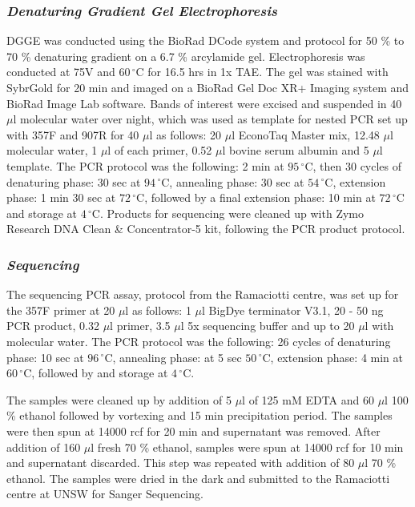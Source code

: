 \documentclass[11pt]{article}
\begin{document}
\subsubsection{\emph{Denaturing Gradient Gel Electrophoresis}}
DGGE was conducted using the BioRad DCode system and protocol for 50 \% to 70 \% denaturing gradient on a 6.7 \% arcylamide gel. Electrophoresis was conducted at 75V and $60\,^{\circ}\mathrm{C}$ for 16.5 hrs in 1x TAE. The gel was stained with SybrGold for 20 min and imaged on a BioRad Gel Doc XR+ Imaging system and BioRad Image Lab software. Bands of interest were excised and suspended in 40 $\mu$l molecular water over night, which was used as template for nested PCR set up with 357F and 907R for 40 $\mu$l as follows: 20 $\mu$l EconoTaq Master mix, 12.48 $\mu$l molecular water, 1 $\mu$l of each primer, 0.52 $\mu$l bovine serum albumin and 5 $\mu$l template. The PCR protocol was the following: 2 min at $95\,^{\circ}\mathrm{C}$, then 30 cycles of denaturing phase: 30 sec at $94\,^{\circ}\mathrm{C}$, annealing phase: 30 sec at  $54\,^{\circ}\mathrm{C}$, extension phase: 1 min 30 sec at $72\,^{\circ}\mathrm{C}$, followed by a final extension phase: 10 min at $72\,^{\circ}\mathrm{C}$ and storage at $4\,^{\circ}\mathrm{C}$. Products for sequencing were cleaned up with Zymo Research DNA Clean \& Concentrator-5 kit, following the PCR product protocol.

\subsubsection{\emph{Sequencing}}
The sequencing PCR assay, protocol from the Ramaciotti centre, was set up for the 357F primer at 20 $\mu$l as follows: 1 $\mu$l BigDye terminator V3.1, 20 - 50 ng PCR product, 0.32 $\mu$l primer, 3.5 $\mu$l 5x sequencing buffer and up to 20 $\mu$l with molecular water. The PCR protocol was the following: 26 cycles of denaturing phase: 10 sec at $96\,^{\circ}\mathrm{C}$, annealing phase:  at 5 sec $50\,^{\circ}\mathrm{C}$, extension phase: 4 min at $60\,^{\circ}\mathrm{C}$, followed by and storage at $4\,^{\circ}\mathrm{C}$.

The samples were cleaned up by addition of 5 $\mu$l of 125 mM EDTA and 60 $\mu$l 100 \% ethanol followed by vortexing and 15 min precipitation period. The samples were then spun at 14000 rcf for 20 min and supernatant was removed. After addition of 160 $\mu$l fresh 70 \% ethanol, samples were spun at 14000 rcf for 10 min and supernatant discarded. This step was repeated with addition of 80 $\mu$l 70 \% ethanol. The samples were dried in the dark and submitted to the Ramaciotti centre at UNSW for Sanger Sequencing.
\end{document}
